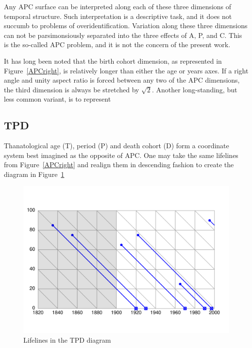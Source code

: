 \documentclass[onehalfspacing]{article}
\begin{document}
Any APC surface can be interpreted along each of these
three dimensions of temporal structure. Such interpretation is a descriptive
task, and it does not succumb to problems of overidentification. Variation along
these three dimensions can not be parsimonsiously separated into the three
effects of A, P, and C. This is the so-called APC problem, and it is not the concern of the
present work. 

It has long been noted \citep{zeuner1869abhandlungen, perozzo1880della} that the
birth cohort dimension, as represented in Figure~\ref{APCright}, is relatively
longer than either the age or years axes. If a right angle and unity aspect
ratio is forced between any two of the APC dimensions, the third dimension is always be
stretched by $\sqrt{2}$. Another long-standing, but less common variant, is to
represent

\FloatBarrier

\subsection*{TPD}

Thanatological age (T), period (P) and death cohort (D) form a coordinate system
best imagined as the opposite of APC. One may take the same lifelines from
Figure~\ref{APCright} and realign them in descending fashion to create the
diagram in Figure~\ref{TPDright}

\begin{figure}[b!]
    \centering
    \includegraphics[scale=.7]{Figures/LabPres/TPD2.pdf}
    \caption{Lifelines in the TPD diagram}
    \label{TPDright}
\end{figure} 
\end{document}
